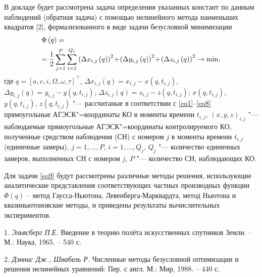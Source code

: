 В докладе будет рассмотрена задача определения указанных констант по данным наблюдений (обратная задача) с помощью нелинейного метода наименьших квадратов [2], формализованного в виде задачи безусловной минимизации
\vskip-7mm
\begin{equation}
\label{eq9}
\begin{gathered}
  \Phi \left( q \right) =  \hfill \\
   = \frac{1}{2}\sum\limits_{j = 1}^P {\sum\limits_{i = 1}^{{Q_j}} {{{\left( {\Delta {x_{i,j}}\left( q \right)} \right)}^2}
\!+\!
{{\left( {\Delta {y_{i,j}}\left( q \right)} \right)}^2}
\!+\!
{{\left( {\Delta {z_{i,j}}\left( q \right)} \right)}^2} \to \min } ,}  \hfill \\
\end{gathered}
\end{equation}
\vskip-5mm
\noindent
где
$q = {\left[ {a,e,i,\Omega ,\omega ,\tau } \right]^{\top}}$,
$\Delta {x_{i,j}}\left( q \right) = {x_{i,j}} \!-\! x\left( {q,{t_{i,j}}} \right)$,
$\Delta {y_{i,j}}\left( q \right) = {y_{i,j}} \!-\! y\left( {q,{t_{i,j}}} \right)$,
$\Delta {z_{i,j}}\left( q \right) = {z_{i,j}} \!-\! z\left( {q,{t_{i,j}}} \right)$;
$x\left( {q,{t_{i,j}}} \right)$,
$y\left( {q,{t_{i,j}}} \right)$,
$z\left( {q,{t_{i,j}}} \right)$ "---
рассчитаные в соответствии с \eqref{eq1}--\eqref{eq8} прямоугольные АГЭСК"=координаты КО в моменты времени
${t_{i,j}}$,
${\left( {x,y,z} \right)_{i,j}}$ "---
наблюдаемые прямоугольные АГЭСК"=координаты контролируемого КО,
полученные средством наблюдения (СН) с номером $j$ в моменты времени
${t_{i,j}}$ (единичные замеры),
$j=1,...,P$,
$i=1,...,Q_j$,
$Q_j$ "--- количество единичных замеров, выполненных СН с номером $j$,
$P$ "--- количество СН, наблюдающих КО.

Для задачи \eqref{eq9} будут рассмотрены различные методы решения, использующие аналитические представления соответствующих частных производных функции
$\Phi \left( q \right)$
 -- метод Гаусса-Ньютона, Левенберга-Марквардта, метод Ньютона и квазиньютоновские методы, и приведены результаты вычислительных экспериментов.

\litlist

1. {\it Эльясберг П.Е.}
 Введение в теорию полёта искусственных спутников Земли. – М.: Наука, 1965. – 540 с.

2. {\it Дэннис Дж., Шнабель Р.} Численные методы безусловной оптимизации и решения нелинейных уравнений: Пер. с англ. М.: Мир, 1988. – 440 с.
